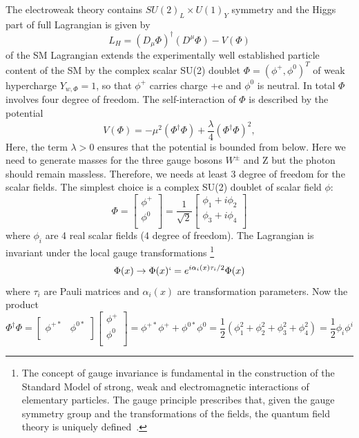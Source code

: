 The electroweak theory contains $SU(2)_L \times U(1)_Y$ symmetry and the Higgs part of full Lagrangian is given by
\begin{equation}
    L_H=(D_{\mu}\Phi)^{\dagger}(D^{\mu}\Phi)-V(\Phi)
\end{equation}
of the SM Lagrangian extends the experimentally well established particle content of the SM by the complex scalar SU(2) doublet $\Phi = (\phi^{+},\phi^0)^T$ of weak hypercharge $Y_{w,\Phi}=1$, so that $\phi^{+}$ carries charge +e and $\phi^0$ is neutral. In total $\Phi$ involves four degree of freedom. The self-interaction of $\Phi$ is described by the potential
\begin{equation}
    V(\Phi)=-\mu^2(\Phi^{\dagger}\Phi)+\frac{\lambda}{4}(\Phi^{\dagger}\Phi)^2,
\end{equation}
Here, the term $\lambda > 0$ ensures that the potential is bounded from below. Here we need to generate masses for the three gauge bosons $W^{\pm}$ and Z but the photon should remain massless. Therefore, we needs at least 3 degree of freedom for the scalar fields. The simplest choice is a complex SU(2) doublet of scalar field $\phi$:
\begin{equation}\label{mat2}
    \Phi=
        \begin{bmatrix}
        \phi^+  \\
        \phi^0  \\
        \end{bmatrix}
    =\frac{1}{\sqrt{2}}
        \begin{bmatrix}
        \phi_1 + i\phi_2    \\
        \phi_3 + i\phi_4    \\
        \end{bmatrix}
\end{equation}
where $\phi_i$ are 4 real scalar fields (4 degree of freedom). The Lagrangian is invariant under the local gauge transformations \footnote{The concept of gauge invariance is fundamental in the construction of the Standard Model of strong, weak and electromagnetic interactions of elementary particles. The gauge principle prescribes that, given the gauge symmetry group and the transformations of the fields, the quantum field theory is uniquely defined~\cite{Coughlan2006}.}
\begin{equation}
    \Phi (x) \rightarrow \Phi(x)`=e^{i\alpha_i(x)\tau_i /2}\Phi(x)
\end{equation}
where $\tau_i$ are Pauli matrices and $\alpha_i(x)$ are transformation parameters.
Now the product
\begin{equation}\label{eq:mat1}
    \Phi^{\dagger}\Phi=
        \begin{bmatrix}
        \phi^{+*}   &   \phi^{0*} \\
        \end{bmatrix}
        \begin{bmatrix}
        \phi^+  \\
        \phi^0  \\
        \end{bmatrix}
    =\phi^{+*} \phi^+ + \phi^{0*}\phi^0
    =\frac{1}{2}(\phi^2_1+\phi^2_2+\phi^2_3+\phi^2_4)
    =\frac{1}{2}\phi_i \phi^i
\end{equation}
    
